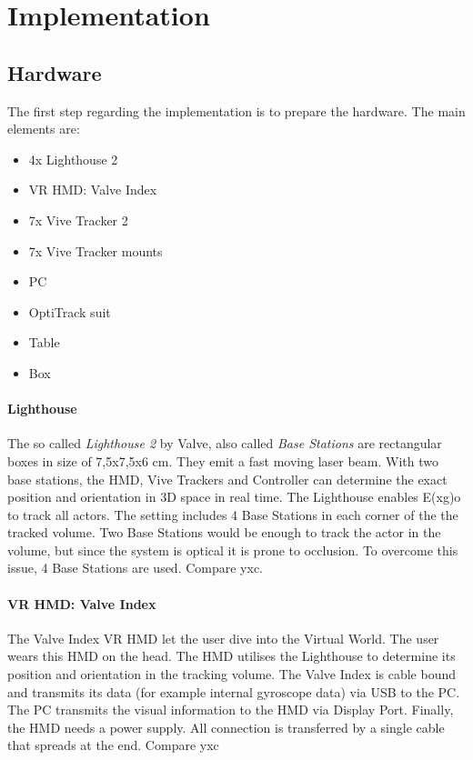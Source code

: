 \chapter{Implementation}


\section{Hardware}
The first step regarding the implementation is to prepare the hardware. The main elements are:
\begin{itemize}
	\item 4x Lighthouse 2
	\item VR HMD: Valve Index
	\item 7x Vive Tracker 2
	\item 7x Vive Tracker mounts
	\item PC
	\item OptiTrack suit
	\item Table
	\item Box
\end{itemize}
\subsubsection{Lighthouse}
The so called \textit{Lighthouse 2} by Valve, also called \textit{Base Stations} are rectangular boxes in size of 7,5x7,5x6 cm. They emit a fast moving laser beam. With two base stations, the HMD, Vive Trackers and Controller can determine the exact position and orientation in 3D space in real time. The Lighthouse enables E(x\textbar g)o to track all actors. The setting includes 4 Base Stations in each corner of the the tracked volume. Two Base Stations would be enough to track the actor in the volume, but since the system is optical it is prone to occlusion. To overcome this issue, 4 Base Stations are used. Compare yxc.
\subsubsection{VR HMD: Valve Index}
The Valve Index VR HMD let the user dive into the Virtual World. The user wears this HMD on the head. The HMD utilises the Lighthouse to determine its position and orientation in the tracking volume. The Valve Index is cable bound and transmits its data (for example internal gyroscope data) via USB to the PC. The PC transmits the visual information to the HMD via Display Port. Finally, the HMD needs a power supply. All connection is transferred by a single cable that spreads at the end. Compare yxc

